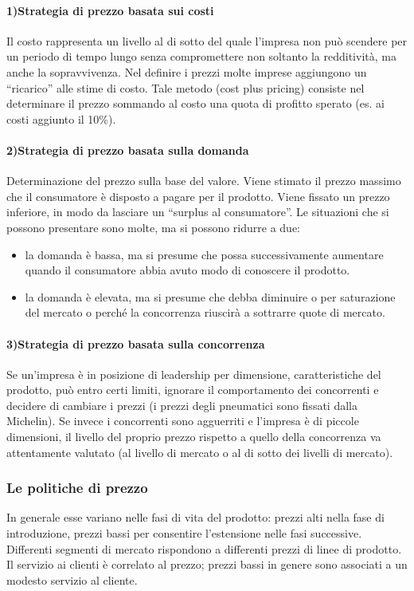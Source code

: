 \paragraph{1)Strategia di prezzo basata sui costi}
Il costo rappresenta un livello al di sotto del quale l’impresa non può scendere per un periodo di tempo lungo senza compromettere non soltanto la redditività, ma anche la sopravvivenza.
Nel definire i prezzi molte imprese aggiungono un “ricarico” alle stime di costo. Tale metodo (cost plus pricing) consiste nel determinare il prezzo sommando al costo una quota di profitto sperato (es. ai costi aggiunto il 10\%).

\paragraph{2)Strategia di prezzo basata sulla domanda}
Determinazione del prezzo sulla base del valore. Viene stimato il prezzo massimo che il consumatore è disposto a pagare per il prodotto. Viene fissato un prezzo inferiore, in modo da lasciare un “surplus al consumatore”.
Le situazioni che si possono presentare sono molte, ma si
possono ridurre a due:
\begin{itemize}
	\item la domanda è bassa, ma si presume che possa successivamente aumentare quando il consumatore abbia avuto modo di conoscere il prodotto.
	\item la domanda è elevata, ma si presume che debba diminuire o per saturazione del mercato o perché la concorrenza riuscirà a sottrarre quote di mercato.
\end{itemize}

\paragraph{3)Strategia di prezzo basata sulla concorrenza}
Se un’impresa è in posizione di leadership per dimensione,
caratteristiche del prodotto, può entro certi limiti, ignorare il comportamento dei concorrenti e decidere di cambiare i prezzi (i prezzi degli pneumatici sono fissati dalla Michelin).
Se invece i concorrenti sono agguerriti e l’impresa è di piccole
dimensioni, il livello del proprio prezzo rispetto a quello della concorrenza va attentamente valutato (al livello di mercato o al di sotto dei livelli di mercato).

\subsubsection{Le politiche di prezzo} In generale esse variano nelle fasi di vita del prodotto: prezzi alti nella fase di introduzione, prezzi bassi per consentire l’estensione nelle fasi successive. 
Differenti segmenti di mercato rispondono a differenti prezzi di linee di prodotto.
Il servizio ai clienti è correlato al prezzo; prezzi bassi in genere sono associati a un modesto servizio al cliente.

